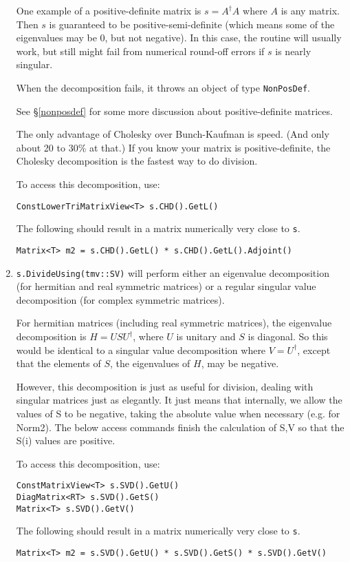 \documentclass[twoside,letterpaper,11pt]{article}
\renewcommand{\tt}[1]{{\texttt {#1}}}
\begin{document}
\begin{enumerate}
One example of a 
positive-definite matrix is $s = A^\dagger A$ where $A$ is any matrix.   
Then $s$ is guaranteed to be positive-semi-definite
(which means some of the eigenvalues may be 0, but not negative).
In this case, the routine will usually work, but still might fail from 
numerical round-off errors if $s$ is nearly singular.  

When the decomposition fails, it throws an object of type
\tt{NonPosDef}.

See \S\ref{nonposdef} for some more discussion about positive-definite
matrices.

The only advantage of Cholesky over Bunch-Kaufman is speed.  (And only about
20 to 30\% at that.)  If you know your 
matrix is positive-definite, the Cholesky decomposition is the fastest way to 
do division.

To access this decomposition, use:
\begin{verbatim}
ConstLowerTriMatrixView<T> s.CHD().GetL()
\end{verbatim}
The following should result in a matrix numerically very close to \tt{s}.
\begin{verbatim}
Matrix<T> m2 = s.CHD().GetL() * s.CHD().GetL().Adjoint()
\end{verbatim}

\item
\tt{s.DivideUsing(tmv::SV)} will perform either an eigenvalue decomposition
(for hermitian and real symmetric matrices) or a regular singular value
decomposition (for complex symmetric matrices).

For hermitian matrices (including real symmetric matrices), 
the eigenvalue decomposition is $H = U S U^\dagger$, where $U$ is
unitary and $S$ is diagonal.  So this would be identical to a singular
value decomposition where $V = U^\dagger$, 
except that the elements of $S$, the eigenvalues of $H$, may be negative.

However, this decomposition is just as useful for division, dealing with singular
matrices just as elegantly.  It just means that internally, we allow the values
of S to be negative, taking the absolute value when necessary (e.g. for Norm2).
The below access commands finish the calculation of S,V so that the S(i)
values are positive. 

To access this decomposition, use:
\begin{verbatim}
ConstMatrixView<T> s.SVD().GetU()
DiagMatrix<RT> s.SVD().GetS()
Matrix<T> s.SVD().GetV()
\end{verbatim}
The following should result in a matrix numerically very close to \tt{s}.
\begin{verbatim}
Matrix<T> m2 = s.SVD().GetU() * s.SVD().GetS() * s.SVD().GetV()
\end{verbatim}


\end{enumerate}
\end{document}
